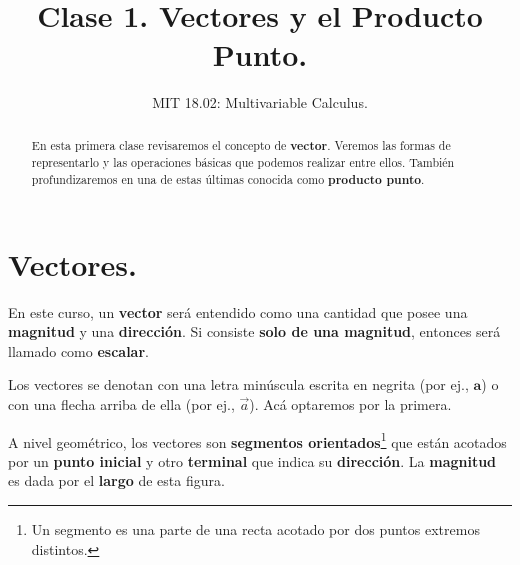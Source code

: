 \documentclass[12pt]{article}
\title{Clase 1. Vectores y el Producto Punto.}
\author{MIT 18.02: Multivariable Calculus.}
\date{}
\begin{document}
\newcommand{\vecmat}[1]{\mathbf{#1}}                          %
\newcommand{\overvec}[1]{\overrightarrow{#1}}                 %
\newcommand{\proy}[2]{\text{proy}_{\vecmat{#2}}{\vecmat{#1}}} %
\newcommand{\R}[0]{\mathbb{R}}                                %
\newcommand{\N}[0]{\mathbb{N}}                                %

\maketitle

\begin{abstract}
\noindent En esta primera clase revisaremos el concepto de \textbf{vector}. Veremos las formas de representarlo y las operaciones básicas que podemos realizar entre ellos. También profundizaremos en una de estas últimas conocida como \textbf{producto punto}.
\end{abstract}

\section{Vectores.}

En este curso, un \textbf{vector} será entendido como una cantidad que posee una \textbf{magnitud} y una \textbf{dirección}. Si consiste \textbf{solo de una magnitud}, entonces será llamado como \textbf{escalar}.

Los vectores se denotan con una letra minúscula escrita en negrita (por ej., $\vecmat{a}$) o con una flecha arriba de ella (por ej., $\vec{a}$). Acá optaremos por la primera.

A nivel geométrico, los vectores son \textbf{segmentos orientados}\footnote{Un segmento es una parte de una recta acotado por dos puntos extremos distintos.} que están acotados por un \textbf{punto inicial} y otro \textbf{terminal} que indica su \textbf{dirección}. La \textbf{magnitud} es dada por el \textbf{largo} de esta figura.
\end{document}
